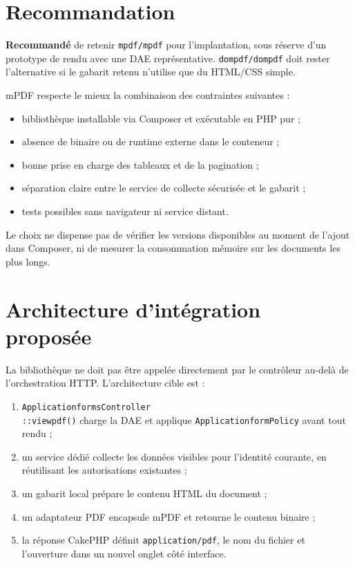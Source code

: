 \documentclass[11pt,a4paper]{article}
\newcommand{\recommande}{\textcolor{vertDAE}{\textbf{Recommandé}}}
\newcommand{\note}[1]{\begin{tcolorbox}[enhanced,colback=bleuClairDAE,colframe=bleuDAE,boxrule=0.6pt,arc=1.5mm]#1\end{tcolorbox}}
\begin{document}
\section{Recommandation}

\note{\recommande{} de retenir \texttt{mpdf/mpdf} pour l'implantation, sous
réserve d'un prototype de rendu avec une DAE représentative. \texttt{dompdf/dompdf}
doit rester l'alternative si le gabarit retenu n'utilise que du HTML/CSS simple.}

mPDF respecte le mieux la combinaison des contraintes suivantes :

\begin{itemize}
  \item bibliothèque installable via Composer et exécutable en PHP pur ;
  \item absence de binaire ou de runtime externe dans le conteneur ;
  \item bonne prise en charge des tableaux et de la pagination ;
  \item séparation claire entre le service de collecte sécurisée et le gabarit ;
  \item tests possibles sans navigateur ni service distant.
\end{itemize}

Le choix ne dispense pas de vérifier les versions disponibles au moment de
l'ajout dans Composer, ni de mesurer la consommation mémoire sur les documents
les plus longs.

\section{Architecture d'intégration proposée}

La bibliothèque ne doit pas être appelée directement par le contrôleur au-delà
de l'orchestration HTTP. L'architecture cible est :

\begin{enumerate}
  \item \texttt{ApplicationformsController}\\
        \texttt{::viewpdf()} charge la DAE et applique
        \texttt{ApplicationformPolicy} avant tout rendu ;
  \item un service dédié collecte les données visibles pour l'identité courante,
        en réutilisant les autorisations existantes ;
  \item un gabarit local prépare le contenu HTML du document ;
  \item un adaptateur PDF encapsule mPDF et retourne le contenu binaire ;
  \item la réponse CakePHP définit \texttt{application/pdf}, le nom du fichier
        et l'ouverture dans un nouvel onglet côté interface.
\end{enumerate}
\end{document}
